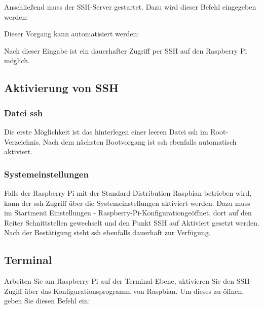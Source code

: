 \medskip



\medskip

Anschließend muss der SSH-Server gestartet. Dazu wird dieser Befehl eingegeben werden:

\medskip


\medskip

Dieser Vorgang kann automatisiert werden:

\medskip


\medskip

Nach dieser Eingabe ist  ein dauerhafter Zugriff per SSH auf den Raspberry Pi möglich.

\subsection{Aktivierung von SSH}


\subsubsection{Datei \glqq ssh\grqq{}}

Die erste Möglichkeit  ist das hinterlegen einer leeren Datei \glqq ssh\grqq{} im Root-Verzeichnis. Nach dem nächsten Bootvorgang ist ssh ebenfalls automatisch aktiviert.

\subsubsection{Systemeinstellungen}

Falls der Raspberry Pi mit der Standard-Distribution Raspbian betrieben wird, kann der ssh-Zugriff über die Systemeinstellungen aktiviert werden. Dazu muss im Startmenü \glqq Einstellungen - Raspberry-Pi-Konfiguration\grqq geöffnet, dort auf den Reiter \glqq Schnittstellen\grqq{} gewechselt und den Punkt \glqq SSH\grqq{}
 auf \glqq Aktiviert\grqq{} gesetzt werden. Nach der Bestätigung steht ssh ebenfalls dauerhaft zur Verfügung.
 
\subsection{Terminal}

Arbeiten Sie am Raspberry Pi auf der Terminal-Ebene, aktivieren Sie den SSH-Zugiff über das Konfigurationsprogramm von Raspbian. Um dieses zu öffnen, geben Sie diesen Befehl ein:

